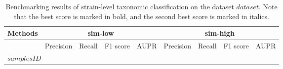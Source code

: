 
\begin{table}[ht]
\renewcommand\arraystretch{1.}
    \centering
    \small
    \setlength\tabcolsep{2pt} 
    \begin{tabular}{p{}|p{1.5cm}<{\centering} p{1.5cm}<{\centering} p{1.5cm}<{\centering} p{1.5cm}<{\centering} | p{1.5cm}<{\centering} p{1.5cm}<{\centering} p{1.5cm}<{\centering} p{}<{\centering} }

    \toprule
    Methods & \multicolumn{4}{c|}{sim-low} & \multicolumn{4}{c}{sim-high}\\
    \hline
    & Precision & Recall & F1 score & AUPR & Precision & \multicolumn{1}{c}{Recall} & \multicolumn{1}{c}{F1 score} & \multicolumn{1}{c}{AUPR} \\
    \midrule
    \multicolumn{4}{l}{$samplesID$} \\
    \hline     
\bottomrule
    \end{tabular}
    \vspace{1mm}
    \caption{Benchmarking results of strain-level taxonomic classification on the dataset $dataset$. Note that the best score is marked in bold, and the second best score is marked in italics. }
    \label{tab:res_strain_$dataset$}
\end{table}
    